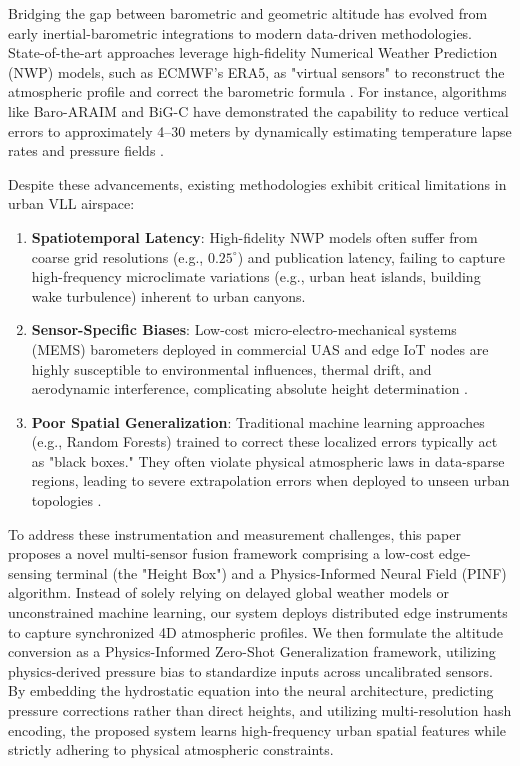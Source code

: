 Bridging the gap between barometric and geometric altitude has evolved from early inertial-barometric integrations to modern data-driven methodologies. State-of-the-art approaches leverage high-fidelity Numerical Weather Prediction (NWP) models, such as ECMWF's ERA5, as "virtual sensors" to reconstruct the atmospheric profile and correct the barometric formula \cite{schumann2017use}. For instance, algorithms like Baro-ARAIM and BiG-C have demonstrated the capability to reduce vertical errors to approximately 4--30 meters by dynamically estimating temperature lapse rates and pressure fields \cite{simonetti2024geodetic, narayanan2022enhanced}.

Despite these advancements, existing methodologies exhibit critical limitations in urban VLL airspace:
\begin{enumerate}
    \item \textbf{Spatiotemporal Latency}: High-fidelity NWP models often suffer from coarse grid resolutions (e.g., $0.25^\circ$) and publication latency, failing to capture high-frequency microclimate variations (e.g., urban heat islands, building wake turbulence) inherent to urban canyons.
    \item \textbf{Sensor-Specific Biases}: Low-cost micro-electro-mechanical systems (MEMS) barometers deployed in commercial UAS and edge IoT nodes are highly susceptible to environmental influences, thermal drift, and aerodynamic interference, complicating absolute height determination \cite{sun20253d, li2023precise}.
    \item \textbf{Poor Spatial Generalization}: Traditional machine learning approaches (e.g., Random Forests) trained to correct these localized errors typically act as "black boxes." They often violate physical atmospheric laws in data-sparse regions, leading to severe extrapolation errors when deployed to unseen urban topologies \cite{zhang2020urban}.
\end{enumerate}


To address these instrumentation and measurement challenges, this paper proposes a novel multi-sensor fusion framework comprising a low-cost edge-sensing terminal (the "Height Box") and a Physics-Informed Neural Field (PINF) algorithm. Instead of solely relying on delayed global weather models or unconstrained machine learning, our system deploys distributed edge instruments to capture synchronized 4D atmospheric profiles. We then formulate the altitude conversion as a Physics-Informed Zero-Shot Generalization framework, utilizing physics-derived pressure bias to standardize inputs across uncalibrated sensors. By embedding the hydrostatic equation into the neural architecture, predicting pressure corrections rather than direct heights, and utilizing multi-resolution hash encoding, the proposed system learns high-frequency urban spatial features while strictly adhering to physical atmospheric constraints.

